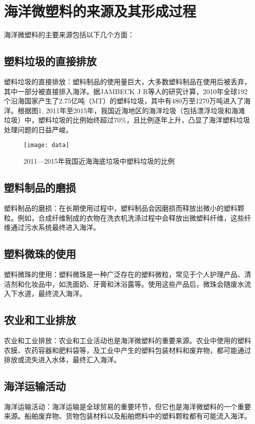 \documentclass{article}
\begin{document}
    \section{海洋微塑料的来源及其形成过程}
    
    海洋微塑料的主要来源包括以下几个方面：
    
    \subsection{塑料垃圾的直接排放}塑料垃圾的直接排放：塑料制品的使用量巨大，大多数塑料制品在使用后被丢弃，其中一部分被直接排入海洋。据JAMBECK J R\cite{01}等人的研究计算，2010年全球192个沿海国家产生了2.75亿吨（MT）的塑料垃圾，其中有480万至1270万吨进入了海洋。根据图1, 2011年至2015年，我国近海地区的海洋垃圾（包括漂浮垃圾和海滩垃圾）中，塑料垃圾的比例始终超过70\%，且比例逐年上升，凸显了海洋塑料垃圾处理问题的日益严峻。
    \begin{figure*}
    	\centering
    	\texttt{[image: data]}
    	\caption{2011—2015年我国近海海底垃圾中塑料垃圾的比例\cite{02}}
    	\label{fg:state}
    \end{figure*}
     
    \subsection{塑料制品的磨损} 塑料制品的磨损：在长期使用过程中，塑料制品会因磨损而释放出微小的塑料颗粒。例如，合成纤维制成的衣物在洗衣机洗涤过程中会释放出微塑料纤维，这些纤维通过污水系统最终进入海洋。
    
    \subsection{塑料微珠的使用} 塑料微珠的使用：塑料微珠是一种广泛存在的塑料微粒，常见于个人护理产品、清洁剂和化妆品中，如洗面奶、牙膏和沐浴露等。使用这些产品后，微珠会随废水流入下水道，最终流入海洋。
    
    \subsection{农业和工业排放} 农业和工业排放：农业和工业活动也是海洋微塑料的重要来源。农业中使用的塑料农膜、农药容器和肥料袋等，及工业中产生的塑料包装材料和废弃物，都可能通过排放或流失进入水体，最终汇入海洋。
    
    \subsection{海洋运输活动} 海洋运输活动：海洋运输是全球贸易的重要环节，但它也是海洋微塑料的一个重要来源。船舶废弃物、货物包装材料以及船舶燃料中的塑料颗粒都有可能流入海洋。
    
\end{document}
